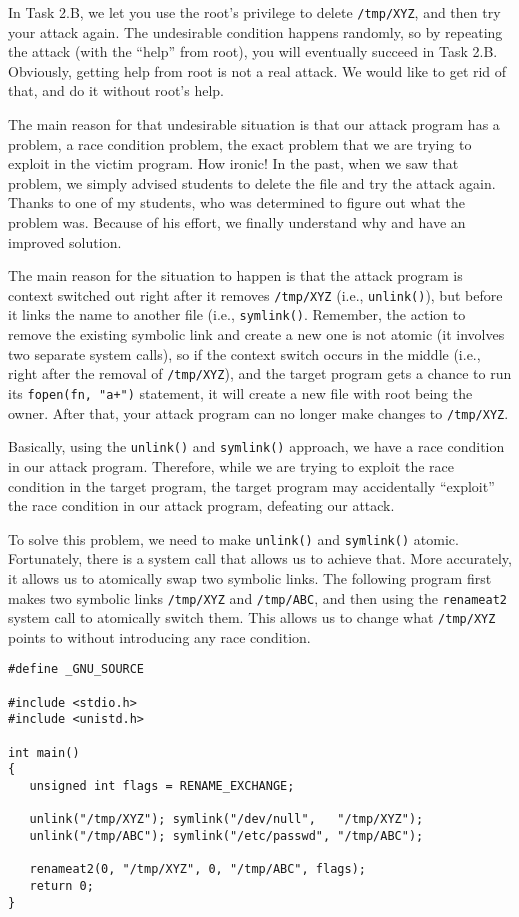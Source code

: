In Task 2.B, we let you use the root's privilege to delete \texttt{/tmp/XYZ}, 
and then try your attack again. The undesirable condition happens randomly,
so by repeating the attack (with the ``help'' from root), you will eventually
succeed in Task 2.B. Obviously, getting help from root is not a real attack. 
We would like to get rid of that, and do it without root's help.


The main reason for that undesirable situation is that 
our attack program has a problem, a race condition problem, the exact problem that
we are trying to exploit in the victim program. How ironic!  
In the past, when we saw that problem, we simply advised students to 
delete the file and try the attack again. Thanks to one of my students, 
who was determined to figure out what the problem was. Because of his effort,
we finally understand why and have an improved solution. 


The main reason for the situation to happen is that the attack program is 
context switched out right after it removes {\tt /tmp/XYZ} (i.e., \texttt{unlink()}),
but before it links the name to another file (i.e., \texttt{symlink()}. 
Remember, the action to remove the existing 
symbolic link and create a new one is not atomic (it involves two 
separate system calls), so if the context switch occurs in the middle
(i.e., right after the removal of {\tt /tmp/XYZ}),
and the target \setuid program gets a chance to run its 
{\tt fopen(fn, "a+")} statement, it will create a new file with root being the owner.
After that, your attack program can no longer make changes to {\tt /tmp/XYZ}.


Basically, using the \texttt{unlink()} and \texttt{symlink()} approach, 
we have a race condition in our attack program. Therefore, while we 
are trying to exploit the race condition in the target program,
the target program may accidentally ``exploit'' the race condition
in our attack program, defeating our attack.  


To solve this problem, we need to make 
\texttt{unlink()} and \texttt{symlink()} atomic. Fortunately, there 
is a system call that allows us to achieve that. More accurately,
it allows us to atomically swap two symbolic links. 
The following program first makes two symbolic links \texttt{/tmp/XYZ}
and \texttt{/tmp/ABC}, and then using the
\texttt{renameat2} system call to atomically switch them. 
This allows us to change what \texttt{/tmp/XYZ} points to
without introducing any race condition. 

\begin{lstlisting}
#define _GNU_SOURCE
  
#include <stdio.h>
#include <unistd.h>

int main()
{
   unsigned int flags = RENAME_EXCHANGE;

   unlink("/tmp/XYZ"); symlink("/dev/null",   "/tmp/XYZ");
   unlink("/tmp/ABC"); symlink("/etc/passwd", "/tmp/ABC");

   renameat2(0, "/tmp/XYZ", 0, "/tmp/ABC", flags);
   return 0;
}
\end{lstlisting}


